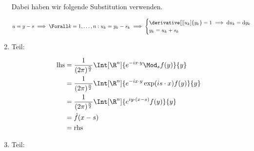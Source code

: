 \begin{solution}
\begin{enumerate}[label = \arabic*.]
    Dabei haben wir folgende Substitution verwenden.

    \begin{align*}
        u = y - s
        \implies
        \Forall k = 1, \dots, n:
        u_k = y_k - s_k
        \implies
        \begin{cases}
            \derivative[][u_k]{y_k} = 1 \implies \mathrm{d} u_k = \mathrm{d} y_k \\
            y_k = u_k + s_k
        \end{cases}
    \end{align*}

    \item Teil:
    
    \begin{align*}
        \mathrm{lhs}
        & =
        \frac{1}{(2 \pi)^\frac{n}{2}}
        \Int[\R^n]
        {
            e^{-i x \cdot y}
            \Mod_s f(y)
        }{y} \\
        & =
        \frac{1}{(2 \pi)^\frac{n}{2}}
        \Int[\R^n]
        {
            e^{-i x \cdot y}
            \exp(i s \cdot x)
            f(y)
        }{y} \\
        & =
        \frac{1}{(2 \pi)^\frac{n}{2}}
        \Int[\R^n]
        {
            e^{i y \cdot (x - s)}
            f(y)
        }{y} \\
        & =
        \hat f(x - s) \\
        & =
        \mathrm{rhs}
    \end{align*}

    \item Teil:
    

\end{enumerate}
\end{solution}
